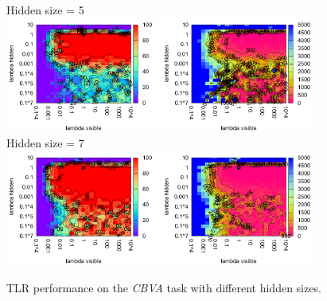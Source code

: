 \begin{figure}[H]
  Hidden size = 5 \\
  \includegraphics[width=0.45\textwidth]{img/k3/tlr-5-success.pdf} 
  \includegraphics[width=0.45\textwidth]{img/k3/tlr-5-epoch.pdf}  
  Hidden size = 7 \\
  \includegraphics[width=0.45\textwidth]{img/k3/tlr-7-success.pdf} 
  \includegraphics[width=0.45\textwidth]{img/k3/tlr-7-epoch.pdf}    
  \caption{TLR performance on the \emph{CBVA} task with different hidden sizes.}
  \label{fig:results-tlr-k3-success}
\end{figure}

